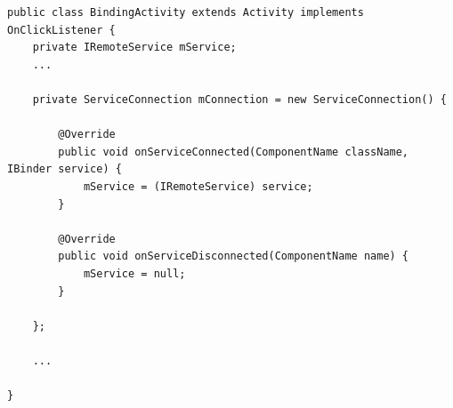 \begin{lstlisting}[frame=single]
public class BindingActivity extends Activity implements OnClickListener {
	private IRemoteService mService;
	...

	private ServiceConnection mConnection = new ServiceConnection() {

		@Override
		public void onServiceConnected(ComponentName className, IBinder service) {
			mService = (IRemoteService) service;
		}

		@Override
		public void onServiceDisconnected(ComponentName name) {
			mService = null;
		}

	};

	...
	
}
\end{lstlisting}

